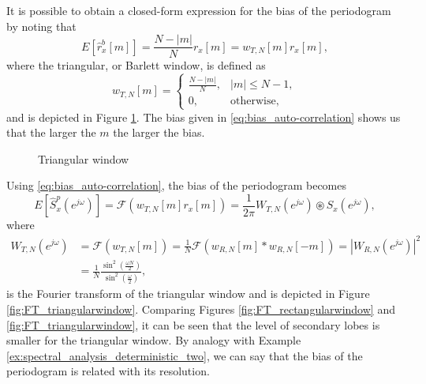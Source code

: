 It is possible to obtain a closed-form expression for the bias of the periodogram by noting that
\begin{equation}
\label{eq:bias_auto-correlation}
E\left[\hat{r}_{x}^{b}[m]\right]  = \frac{N - |m|}{N} r_{x}[m] = w_{T,N}[m] r_{x}[m],
\end{equation}
where the triangular, or Barlett window, is defined as
\begin{equation*}
w_{T,N}[m] = \begin{cases} \frac{N - |m|}{N}, & |m| \leq N-1, \\
0, & \text{otherwise},
\end{cases}
\end{equation*}
and is depicted in Figure \ref{fig:triangularwindow}. The bias given in \eqref{eq:bias_auto-correlation} shows us that the larger the $m$ the larger the bias.
\begin{figure}
	\begin{center}
	\end{center}
	\caption{Triangular window}
	\label{fig:triangularwindow}
\end{figure}


Using \eqref{eq:bias_auto-correlation}, the bias of the periodogram becomes
\begin{equation}
\label{eq:bias_periodogram}
E\left[\hat{S}_x^{p}(e^{j \omega}) \right] = \mathcal{F}\left(w_{T,N}[m] r_{x}[m]\right) = \frac{1}{2 \pi} W_{T,N}(e^{j \omega}) \circledast S_x(e^{j \omega}),
\end{equation}
where
\begin{align*}
W_{T,N}(e^{j \omega}) &= \mathcal{F}\left(w_{T,N}[m]\right) = \frac{1}{N} \mathcal{F}\left(w_{R,N}[m] \ast w_{R,N}[-m]\right) = |W_{R,N}(e^{j \omega})|^2 \nonumber  \\  &= \frac{1}{N} \frac{\sin^2\left(\frac{\omega N}{2}\right)}{\sin^2\left(\frac{\omega}{2}\right)},
\end{align*}
is the Fourier transform of the triangular window and is depicted in Figure \ref{fig:FT_triangularwindow}. Comparing Figures \ref{fig:FT_rectangularwindow} and \ref{fig:FT_triangularwindow}, it can be seen that the level of secondary lobes is smaller for the triangular window. By analogy with Example \ref{ex:spectral_analysis_deterministic_two}, we can say that the bias of the periodogram is related with its resolution.

